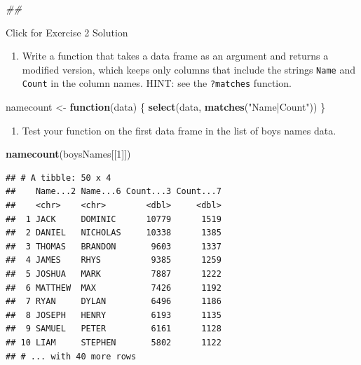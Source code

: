 \documentclass[
]{book}
\newenvironment{Shaded}{\begin{snugshade}}{\end{snugshade}}
\newcommand{\CommentTok}[1]{\textcolor[rgb]{0.56,0.35,0.01}{\textit{#1}}}
\newcommand{\ControlFlowTok}[1]{\textcolor[rgb]{0.13,0.29,0.53}{\textbf{#1}}}
\newcommand{\DecValTok}[1]{\textcolor[rgb]{0.00,0.00,0.81}{#1}}
\newcommand{\KeywordTok}[1]{\textcolor[rgb]{0.13,0.29,0.53}{\textbf{#1}}}
\newcommand{\NormalTok}[1]{#1}
\newcommand{\StringTok}[1]{\textcolor[rgb]{0.31,0.60,0.02}{#1}}
\providecommand{\tightlist}{%
  \setlength{\itemsep}{0pt}\setlength{\parskip}{0pt}}
\begin{document}
\begin{Shaded}
\begin{Highlighting}[]
\CommentTok{\#\# }
\end{Highlighting}
\end{Shaded}

{Click for Exercise 2 Solution}

\begin{alert}

\begin{enumerate}
\def\labelenumi{\arabic{enumi}.}
\tightlist
\item
  Write a function that takes a data frame as an argument and returns a modified version, which keeps only columns that include the strings \texttt{Name} and \texttt{Count} in the column names. HINT: see the \texttt{?matches} function.
\end{enumerate}

\begin{Shaded}
\begin{Highlighting}[]
\NormalTok{  namecount \textless{}{-}}\StringTok{ }\ControlFlowTok{function}\NormalTok{(data) \{}
      \KeywordTok{select}\NormalTok{(data, }\KeywordTok{matches}\NormalTok{(}\StringTok{"Name|Count"}\NormalTok{))}
\NormalTok{  \}}
\end{Highlighting}
\end{Shaded}

\begin{enumerate}
\def\labelenumi{\arabic{enumi}.}
\setcounter{enumi}{1}
\tightlist
\item
  Test your function on the first data frame in the list of boys names data.
\end{enumerate}

\begin{Shaded}
\begin{Highlighting}[]
  \KeywordTok{namecount}\NormalTok{(boysNames[[}\DecValTok{1}\NormalTok{]])}
\end{Highlighting}
\end{Shaded}

\begin{verbatim}
## # A tibble: 50 x 4
##    Name...2 Name...6 Count...3 Count...7
##    <chr>    <chr>        <dbl>     <dbl>
##  1 JACK     DOMINIC      10779      1519
##  2 DANIEL   NICHOLAS     10338      1385
##  3 THOMAS   BRANDON       9603      1337
##  4 JAMES    RHYS          9385      1259
##  5 JOSHUA   MARK          7887      1222
##  6 MATTHEW  MAX           7426      1192
##  7 RYAN     DYLAN         6496      1186
##  8 JOSEPH   HENRY         6193      1135
##  9 SAMUEL   PETER         6161      1128
## 10 LIAM     STEPHEN       5802      1122
## # ... with 40 more rows
\end{verbatim}


\end{alert}
\end{document}
